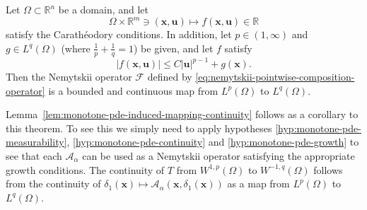 \begin{Theorem}
\label{thm:nemytskii-lp-lq-bounded-continuous}
Let $\Omega\subset\mathbb{R}^n$ be a domain, and let
\begin{equation}\label{eq:nemytskii-growth-theorem-function-domain}
\Omega\times\mathbb{R}^m\ni(\bm{x},\bm{u})\mapsto f(\bm{x},\bm{u})\in\mathbb{R}
\end{equation}
satisfy the Carathéodory conditions. In addition, let $p\in(1,\infty)$ and $g\in L^q(\Omega)$ (where $\frac{1}{p}+\frac{1}{q}=1$) be given, and let $f$ satisfy
\begin{equation}\label{eq:nemytskii-growth-bound-lp-lq}
|f(\bm{x},\bm{u})|\leq C|\bm{u}|^{p-1}+g(\bm{x}).
\end{equation}
Then the Nemytskii operator $\mathcal{F}$ defined by \eqref{eq:nemytskii-pointwise-composition-operator} is a bounded and continuous map from $L^p(\Omega)$ to $L^q(\Omega)$.
\end{Theorem}

\begin{Remark}
\label{rem:nemytskii-monotone-pde-continuity-corollary}
Lemma~\ref{lem:monotone-pde-induced-mapping-continuity} follows as a corollary to this theorem. To see this we simply need to apply hypotheses \ref{hyp:monotone-pde-measurability}, \ref{hyp:monotone-pde-continuity} and \ref{hyp:monotone-pde-growth} to see that each $\mathcal{A}_\alpha$ can be used as a Nemytskii operator satisfying the appropriate growth conditions. The continuity of $T$ from $W^{1,p}(\Omega)$ to $W^{-1,q}(\Omega)$ follows from the continuity of $\delta_1(\bm{x})\mapsto\mathcal{A}_\alpha(\bm{x},\delta_1(\bm{x}))$ as a map from $L^p(\Omega)$ to $L^q(\Omega)$.
\end{Remark}
